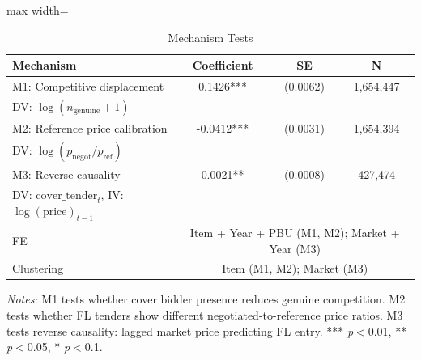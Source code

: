 \begin{table}[htbp]
\centering
\caption{Mechanism Tests}
\label{tab:mechanisms}
\begin{adjustbox}{max width=\textwidth}
\begin{threeparttable}
\small
\begin{tabular}{lccc}
\toprule
Mechanism & Coefficient & SE & N \\
\midrule
M1: Competitive displacement & 0.1426*** & (0.0062) & 1,654,447 \\
\quad DV: $\log(n_{\text{genuine}} + 1)$ & & & \\
M2: Reference price calibration & -0.0412*** & (0.0031) & 1,654,394 \\
\quad DV: $\log(p_{\text{negot}} / p_{\text{ref}})$ & & & \\
M3: Reverse causality & 0.0021** & (0.0008) & 427,474 \\
\quad DV: $\text{cover\_tender}_t$, IV: $\log(\text{price})_{t-1}$ & & & \\
\midrule
FE & \multicolumn{3}{c}{Item + Year + PBU (M1, M2); Market + Year (M3)} \\
Clustering & \multicolumn{3}{c}{Item (M1, M2); Market (M3)} \\
\bottomrule
\end{tabular}
\begin{tablenotes}
\small
\item \textit{Notes:} M1 tests whether cover bidder presence reduces genuine competition.
M2 tests whether FL tenders show different negotiated-to-reference price ratios.
M3 tests reverse causality: lagged market price predicting FL entry.
*** \textit{p}$<$0.01, ** \textit{p}$<$0.05, * \textit{p}$<$0.1.
\end{tablenotes}
\end{threeparttable}
\end{adjustbox}
\end{table}
